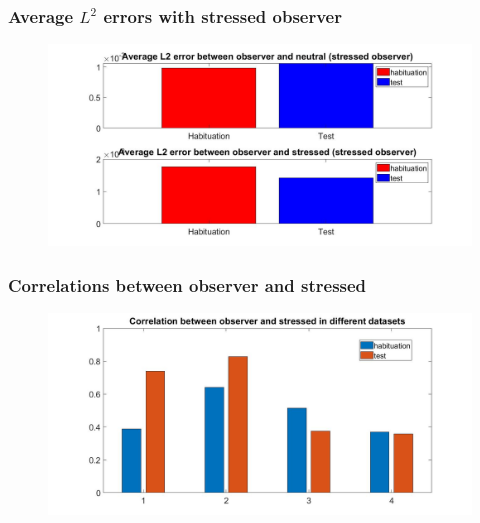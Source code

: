 \documentclass{beamer}
\begin{document}
\begin{frame}
\frametitle{Average $L^2$ errors with stressed observer}


\begin{figure}[H]
	\begin{center}
		\hspace*{-1.7cm}
		\includegraphics[scale=.32]{avg_L22.jpg} 
	\end{center}  
	
	
\end{figure}



\end{frame}


\begin{frame}
\frametitle{ Correlations between observer and stressed}



\begin{figure}[H]
	\begin{center}
		\hspace*{-1.7cm}
		\includegraphics[scale=.32]{corr_bar_stress.jpg} 
	\end{center}  
	
	
\end{figure}

\end{frame}
\end{document}
